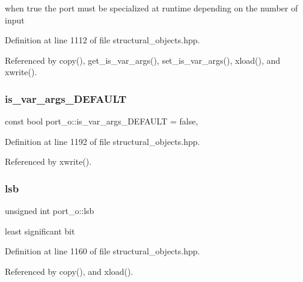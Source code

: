 when true the port must be specialized at runtime depending on the number of input 



Definition at line 1112 of file structural\+\_\+objects.\+hpp.



Referenced by copy(), get\+\_\+is\+\_\+var\+\_\+args(), set\+\_\+is\+\_\+var\+\_\+args(), xload(), and xwrite().

\mbox{\label{structport__o_a0c696eb13cf75691600e0ff9b843a4a4}} 
\subsubsection{\texorpdfstring{is\+\_\+var\+\_\+args\+\_\+\+D\+E\+F\+A\+U\+LT}{is\_var\_args\_DEFAULT}}
{\footnotesize\ttfamily const bool port\+\_\+o\+::is\+\_\+var\+\_\+args\+\_\+\+D\+E\+F\+A\+U\+LT = false\hspace{0.3cm}{\ttfamily [static]}, {\ttfamily [private]}}



Definition at line 1192 of file structural\+\_\+objects.\+hpp.



Referenced by xwrite().

\mbox{\label{structport__o_afb3794f44682a764b7d9643a0956405f}} 
\subsubsection{\texorpdfstring{lsb}{lsb}}
{\footnotesize\ttfamily unsigned int port\+\_\+o\+::lsb\hspace{0.3cm}{\ttfamily [private]}}



least significant bit 



Definition at line 1160 of file structural\+\_\+objects.\+hpp.



Referenced by copy(), and xload().

\mbox{\label{structport__o_ac68564ec9d759f9f6d71dcaef3fe8068}} 
